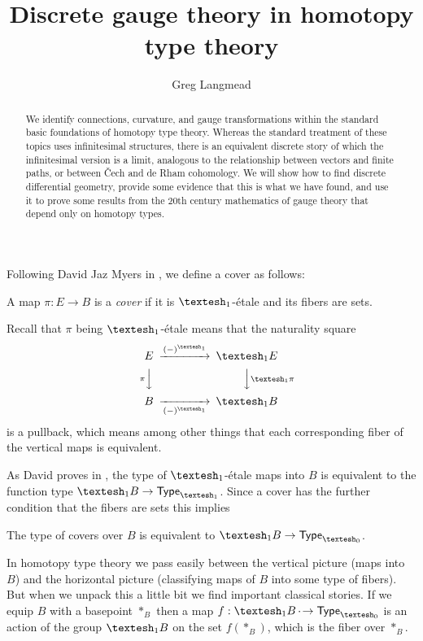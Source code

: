 \documentclass[12pt]{article}
\title{Discrete gauge theory in homotopy type theory}
\author{Greg Langmead}
\begin{document}
\begin{abstract}
We identify connections, curvature, and gauge transformations within the standard basic foundations of homotopy type theory. Whereas the standard treatment of these topics uses infinitesimal structures, there is an equivalent discrete story of which the infinitesimal version is a limit, analogous to the relationship between vectors and finite paths, or between Čech and de Rham cohomology. We will show how to find discrete differential geometry, provide some evidence that this is what we have found, and use it to prove some results from the 20th century mathematics of gauge theory that depend only on homotopy types.
\end{abstract}



Following David Jaz Myers in \cite{myersgood}, we define a cover as follows:

\begin{mydef}
  A map \(\pi:E\to B\) is a \emph{cover} if it is \(\shapeo\)-étale and its fibers are sets.
\end{mydef}

Recall that \(\pi\) being \(\shapeo\)-étale means that the naturality square 
\[
\begin{CD}
E @>(-)^{\shapeo}>> \shapeo E \\
@V{\pi}VV @VV{\shapeo \pi}V \\
B @>>(-)^{\shapeo}> \shapeo B
\end{CD}
\]
is a pullback, which means among other things that each corresponding fiber of the vertical maps is equivalent.

As David proves in \cite{myersgood}, the type of \(\shapeo\)-étale maps into \(B\) is equivalent to the function type \(\shapeo B \to \Typeo\). Since a cover has the further condition that the fibers are sets this implies

\begin{mylemma}
  The type of covers over \(B\) is equivalent to \(\shapeo B \to \Type_{\shapez}\).
\end{mylemma}

In homotopy type theory we pass easily between the vertical picture (maps into \(B\)) and the horizontal picture (classifying maps of \(B\) into some type of fibers). But when we unpack this a little bit we find important classical stories. If we equip \(B\) with a basepoint \(*_B\) then a map \(f:\shapeo B \dotto \Type_{\shapez}\) is an action of the group \(\shapeo B\) on the set \(f(*_B)\), which is the fiber over \(*_B\).
\end{document}
